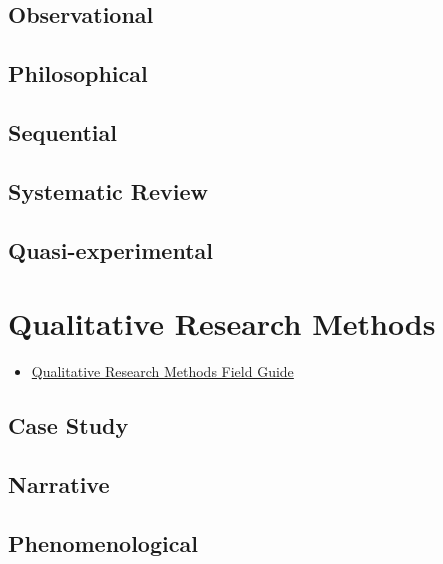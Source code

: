 \documentclass[]{book}
\providecommand{\tightlist}{%
  \setlength{\itemsep}{0pt}\setlength{\parskip}{0pt}}
\begin{document}
\hypertarget{observational}{%
\section{Observational}\label{observational}}

\hypertarget{philosophical}{%
\section{Philosophical}\label{philosophical}}

\hypertarget{sequential}{%
\section{Sequential}\label{sequential}}

\hypertarget{systematic-review}{%
\section{Systematic Review}\label{systematic-review}}

\hypertarget{quasi-experimental}{%
\section{Quasi-experimental}\label{quasi-experimental}}

\hypertarget{qualmethods}{%
\chapter{Qualitative Research Methods}\label{qualmethods}}

\begin{itemize}
\tightlist
\item
  \href{https://course.ccs.neu.edu/is4800sp12/resources/qualmethods.pdf}{Qualitative Research Methods Field Guide}
\end{itemize}

\hypertarget{case-study-1}{%
\section{Case Study}\label{case-study-1}}

\hypertarget{narrative}{%
\section{Narrative}\label{narrative}}

\hypertarget{phenomenological}{%
\section{Phenomenological}\label{phenomenological}}
\end{document}
